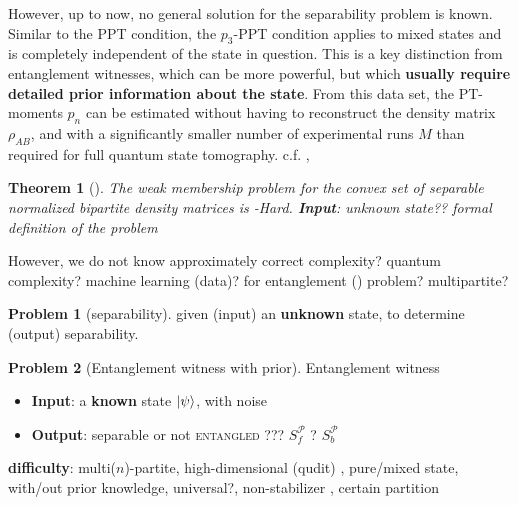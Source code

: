 \documentclass[
aps,
pra,
floatfix,
]{revtex4-2}
\theoremstyle{plain}
\newtheorem{theorem}{Theorem}
\newtheorem{question}{Question}
\theoremstyle{definition}
\newtheorem{problem}{Problem}
\newcommand{\separable}{S}
\newcommand{\ppartition}{\mathcal{P}}
\newcommand{\dm}{\rho}
\begin{document}
However, up to now, no general solution for the separability problem is known.
Similar to the PPT condition, the $p_3$-PPT condition applies to mixed states and is completely independent of the state in question. This is a key distinction from entanglement witnesses, which can be more powerful, but which \textbf{usually require detailed prior information about the state}.
From this data set, the PT-moments $p_n$ can be estimated without having to reconstruct the density matrix $\dm_{AB}$, and with a significantly smaller number of experimental runs $M$ than required for full quantum state tomography.
c.f. , 
\begin{theorem}[\cite{gurvitsClassicalDeterministicComplexity2003}]
	The weak membership problem for the convex set of separable normalized bipartite density matrices is -Hard.
	\textbf{Input}: unknown state?? formal definition of the problem
	\cite{ioannouComputationalComplexityQuantum2007}
\end{theorem}
	However, we do not know 
	approximately correct complexity? quantum complexity? machine learning (data)? for entanglement () problem? multipartite?
\begin{problem}[separability]\label{prm:separable}
	given (input) an \textbf{unknown} state, to determine (output) separability.
\end{problem}
\begin{problem}[Entanglement witness with prior]
	Entanglement witness	
		\begin{itemize}
		\item \textbf{Input}: a \textbf{known} state $\ket{\psi}$, with noise
		\item \textbf{Output}: \textsf{separable} or not \textsc{entangled} ??? $\separable_f^\ppartition$ ? $\separable_b^\ppartition$ 
	\end{itemize}
	\textbf{difficulty}: multi($n$)-partite, high-dimensional (qudit) \cite{sciaraUniversalPartiteLevel2019}, pure/mixed state, with/out prior knowledge, universal?, non-stabilizer \cite{tothEntanglementDetectionStabilizer2005}, certain partition
\end{problem}
\end{document}

